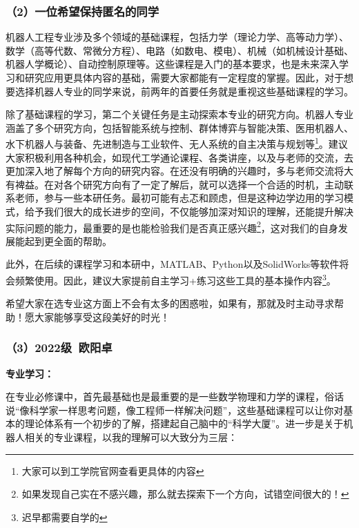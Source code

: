 \documentclass[11pt,oneside]{book}
\begin{document}
\subsubsection{（2）一位希望保持匿名的同学}
机器人工程专业涉及多个领域的基础课程，包括力学（理论力学、高等动力学）、数学（高等代数、常微分方程）、电路（如数电、模电）、机械（如机械设计基础、机器人学概论）、自动控制原理等。这些课程是入门的基本要求，也是未来深入学习和研究应用更具体内容的基础，需要大家都能有一定程度的掌握。因此，对于想要选择机器人专业的同学来说，前两年的首要任务就是重视这些基础课程的学习。

\vspace{10pt}

除了基础课程的学习，第二个关键任务是主动探索本专业的研究方向。机器人专业涵盖了多个研究方向，包括智能系统与控制、群体博弈与智能决策、医用机器人、水下机器人与装备、先进制造与工业软件、无人系统的自主决策与规划等\footnote{大家可以到工学院官网查看更具体的内容}。建议大家积极利用各种机会，如现代工学通论课程、各类讲座，以及与老师的交流，去更加深入地了解每个方向的研究内容。在还没有明确的兴趣时，多与老师交流将大有裨益。在对各个研究方向有了一定了解后，就可以选择一个合适的时机，主动联系老师，参与一些本研任务。最初可能有忐忑和顾虑，但是这种边学边用的学习模式，给予我们很大的成长进步的空间，不仅能够加深对知识的理解，还能提升解决实际问题的能力，最重要的是也能检验我们是否真正感兴趣\footnote{如果发现自己实在不感兴趣，那么就去探索下一个方向，试错空间很大的！}，这对我们的自身发展能起到更全面的帮助。

\vspace{10pt}

此外，在后续的课程学习和本研中，MATLAB、Python以及SolidWorks等软件将会频繁使用。因此，建议大家提前自主学习+练习这些工具的基本操作内容\footnote{迟早都需要自学的}。

\vspace{10pt}

希望大家在选专业这方面上不会有太多的困惑啦，如果有，那就及时主动寻求帮助！愿大家能够享受这段美好的时光！

\subsubsection{（3）2022级\ 欧阳卓}
\textbf{专业学习：}

在专业必修课中，首先最基础也是最重要的是一些数学物理和力学的课程，俗话说“像科学家一样思考问题，像工程师一样解决问题”，这些基础课程可以让你对基本的理论体系有一个初步的了解，搭建起自己脑中的“科学大厦”。进一步是关于机器人相关的专业课程，以我的理解可以大致分为三层：
\end{document}

